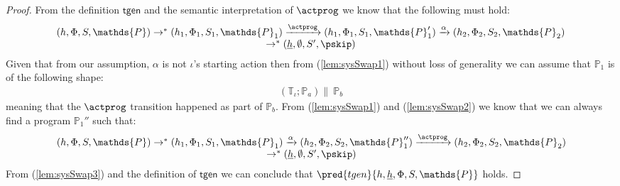 \begin{lem}
\begin{proof}
	From the definition $\mathsf{tgen}$ and the semantic interpretation of $\actprog$ we know that the following must hold:
	\begin{gather}
		\label{lem:sysSwap1}
		\begin{array}{c}
			(h, \Phi, S, \mathds{P}) \rightarrow^* (h_1, \Phi_1, S_1, \mathds{P}_1) \xrightarrow{\actprog} (h_1, \Phi_1, S_1, \mathds{P}_1') \xrightarrow{\alpha} (h_2, \Phi_2, S_2, \mathds{P}_2) \\ \rightarrow^* (\underline{h}, \emptyset, S', \pskip)
		\end{array}
	\end{gather}
	Given that from our assumption, $\alpha$ is not $\iota$'s starting action then from (\ref{lem:sysSwap1}) without loss of generality we can assume that $\mathds{P}_1$ is of the following shape:
	\begin{gather}
		\label{lem:sysSwap2}
		\left( \mathds{T}_\iota ; \mathds{P}_a \right) \|\ \mathds{P}_b
	\end{gather}
	meaning that the $\actprog$ transition happened as part of $\mathds{P}_b$. From (\ref{lem:sysSwap1}) and (\ref{lem:sysSwap2}) we know that we can always find a program $\mathds{P}_1''$ such that:
	\begin{gather}
		\label{lem:sysSwap3}
		\begin{array}{c}
			(h, \Phi, S, \mathds{P}) \rightarrow^* (h_1, \Phi_1, S_1, \mathds{P}_1) \xrightarrow{\alpha} (h_2, \Phi_2, S_2, \mathds{P}_1'') \xrightarrow{\actprog} (h_2, \Phi_2, S_2, \mathds{P}_2) \\ \rightarrow^* (\underline{h}, \emptyset, S', \pskip)
		\end{array}
	\end{gather}
	From (\ref{lem:sysSwap3}) and the definition of $\mathsf{tgen}$ we can conclude that $\pred{tgen}{h, \underline{h}, \Phi, S, \mathds{P}}$ holds.
	\end{proof}
\end{lem}